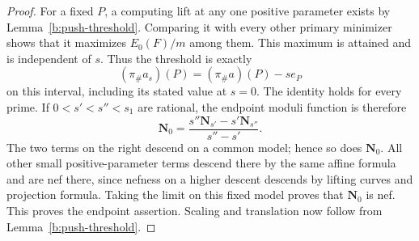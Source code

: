\begin{proof}
For a fixed \(P\), a computing lift at any one positive parameter
exists by Lemma~\ref{b:push-threshold}. Comparing it with every
other primary minimizer shows that it maximizes
\(E_0(F)/m\) among them. This maximum is attained and is independent
of \(s\). Thus the threshold is exactly
\[
                    (\pi_\#a_s)(P)
                         =(\pi_\#a)(P)-s e_P
\]
on this interval, including its stated value at \(s=0\).
The identity holds for every prime. If \(0<s'<s''<s_1\) are
rational, the endpoint moduli function is therefore
\[
 \mathbf N_0=
       \frac{s''\mathbf N_{s'}-s'\mathbf N_{s''}}{s''-s'}.
\]
The two terms on the right descend on a common model; hence so does
\(\mathbf N_0\). All other small positive-parameter terms descend
there by the same affine formula and are nef there, since nefness
on a higher descent descends by lifting curves and projection
formula. Taking the limit on this fixed model proves that
\(\mathbf N_0\) is nef. This proves the endpoint assertion.
Scaling and translation now follow from
Lemma~\ref{b:push-threshold}.
\end{proof}
